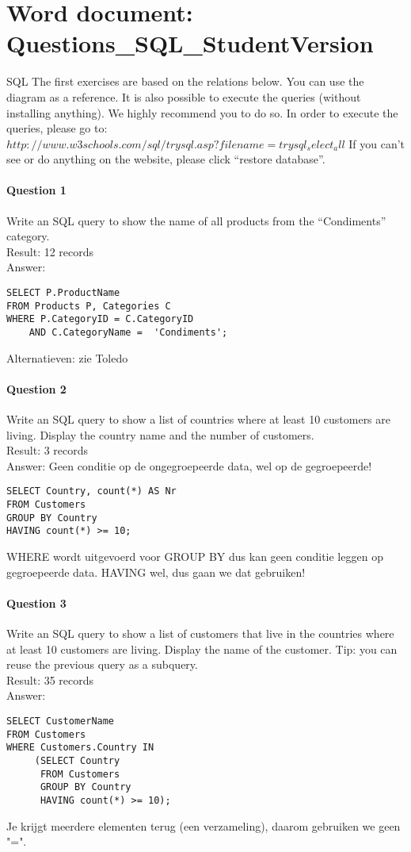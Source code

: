 \documentclass[10pt,a4paper]{report}
\begin{document}
\section{Word document: Questions\_SQL\_StudentVersion}
SQL
The first exercises are based on the relations below. You can use the diagram as a reference. It is also possible to execute the queries (without installing anything). We highly recommend you to do so.
In order to execute the queries, please go to:
$http://www.w3schools.com/sql/trysql.asp?filename=trysql_select_all$
If you can’t see or do anything on the website, please click “restore database”.

\paragraph{Question 1}
Write an SQL query to show the name of all products from the “Condiments” category.\\
Result: 12 records\\
Answer:
\begin{verbatim}
SELECT P.ProductName 
FROM Products P, Categories C 
WHERE P.CategoryID = C.CategoryID
    AND C.CategoryName =  'Condiments'; 
\end{verbatim}
Alternatieven: zie Toledo

\paragraph{Question 2}
Write an SQL query to show a list of countries where at least 10 customers are living. Display the country name and the number of customers.\\
Result: 3 records\\
Answer: Geen conditie op de ongegroepeerde data, wel op de gegroepeerde!
\begin{verbatim}
SELECT Country, count(*) AS Nr 
FROM Customers 
GROUP BY Country 
HAVING count(*) >= 10;
\end{verbatim}
WHERE wordt uitgevoerd voor GROUP BY dus kan geen conditie leggen op gegroepeerde data. HAVING wel, dus gaan we dat gebruiken!

\paragraph{Question 3}
Write an SQL query to show a list of customers that live in the countries where at least 10 customers are living. Display the name of the customer. Tip: you can reuse the previous query as a subquery.\\
Result: 35 records\\
Answer:
\begin{verbatim}
SELECT CustomerName 
FROM Customers 
WHERE Customers.Country IN                  
     (SELECT Country
      FROM Customers
      GROUP BY Country
      HAVING count(*) >= 10);
\end{verbatim}
Je krijgt meerdere elementen terug (een verzameling), daarom gebruiken we geen "=".
\end{document}

